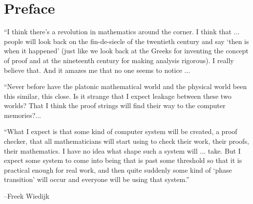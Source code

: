 
\chapter*{Preface}


%
%
%




{

\narrower

{\it

  ``I think there's a revolution in mathematics around the corner. I
  think that $\ldots$ %
  people will look back on the fin-de-siecle of the twentieth century
  and say `then is when it happened' (just like we look back at the
  Greeks for inventing the concept of proof and at the nineteenth
  century for making analysis rigorous). I really believe that. And it
  amazes me that no one seems to notice $\ldots$

  ``Never before have the platonic mathematical world and the physical
  world been this similar, this close. Is it strange that I expect
  leakage between these two worlds? That I think the proof strings
  will find their way to the computer memories?$\ldots$

  ``What I expect is that some kind of computer system will be
  created, a proof checker, that all mathematicians will start using
  to check their work, their proofs, their mathematics. I have no idea
  what shape such a system will $\ldots$ take. But I expect some
  system to come into being that is past some threshold so that it is
  practical enough for real work, and then quite suddenly some kind of
  `phase transition' will occur and everyone will be using that
  system.''

{\hfill--Freek Wiedijk \cite{FWR}} %

}

}

